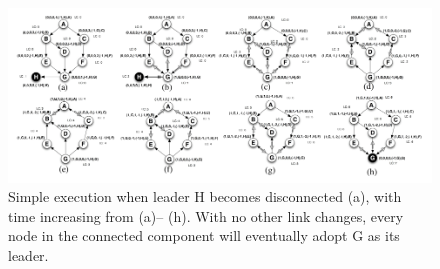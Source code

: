 \begin{figure}[hbtp]
\centering
\includegraphics[scale=.5]{screenshot_1.png}
\caption{Simple execution when leader H becomes disconnected (a), with time increasing from (a)–
(h). With no other link changes, every node in the connected component will eventually adopt G as
its leader.}
\end{figure}




